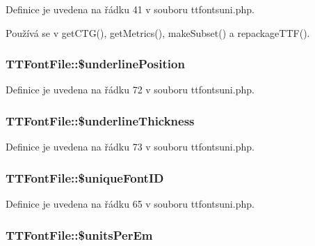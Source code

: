 Definice je uvedena na řádku 41 v souboru ttfontsuni.\-php.



Používá se v get\-C\-T\-G(), get\-Metrics(), make\-Subset() a repackage\-T\-T\-F().

\hypertarget{class_t_t_font_file_a72bd51c23735e8079b1f1d41e33f6f9a}{
\subsubsection[{\$underline\-Position}]{\setlength{\rightskip}{0pt plus 5cm}T\-T\-Font\-File\-::\$underline\-Position}}\label{class_t_t_font_file_a72bd51c23735e8079b1f1d41e33f6f9a}


Definice je uvedena na řádku 72 v souboru ttfontsuni.\-php.

\hypertarget{class_t_t_font_file_adc1902e34a647cbc3440f478b0598826}{
\subsubsection[{\$underline\-Thickness}]{\setlength{\rightskip}{0pt plus 5cm}T\-T\-Font\-File\-::\$underline\-Thickness}}\label{class_t_t_font_file_adc1902e34a647cbc3440f478b0598826}


Definice je uvedena na řádku 73 v souboru ttfontsuni.\-php.

\hypertarget{class_t_t_font_file_a8b8adf6855223e67ac16a67f86c94d9c}{
\subsubsection[{\$unique\-Font\-I\-D}]{\setlength{\rightskip}{0pt plus 5cm}T\-T\-Font\-File\-::\$unique\-Font\-I\-D}}\label{class_t_t_font_file_a8b8adf6855223e67ac16a67f86c94d9c}


Definice je uvedena na řádku 65 v souboru ttfontsuni.\-php.

\hypertarget{class_t_t_font_file_ae3ecc7f8626da668176cccb7cefd6cd4}{
\subsubsection[{\$units\-Per\-Em}]{\setlength{\rightskip}{0pt plus 5cm}T\-T\-Font\-File\-::\$units\-Per\-Em}}\label{class_t_t_font_file_ae3ecc7f8626da668176cccb7cefd6cd4}


